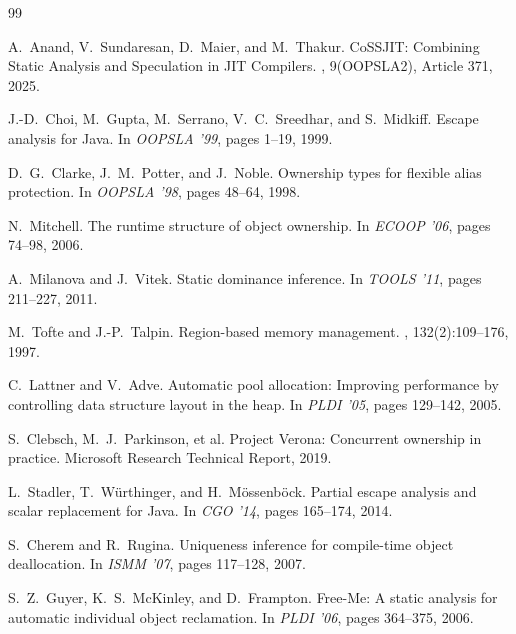 \documentclass[12pt,a4paper]{article}
\begin{document}

\begin{thebibliography}{99}

A.~Anand, V.~Sundaresan, D.~Maier, and M.~Thakur.
\newblock CoSSJIT: Combining Static Analysis and Speculation in JIT Compilers.
, 9(OOPSLA2), Article 371, 2025.

J.-D.~Choi, M.~Gupta, M.~Serrano, V.~C.~Sreedhar, and S.~Midkiff.
\newblock Escape analysis for {Java}.
\newblock In {\em OOPSLA '99}, pages 1--19, 1999.

D.~G.~Clarke, J.~M.~Potter, and J.~Noble.
\newblock Ownership types for flexible alias protection.
\newblock In {\em OOPSLA '98}, pages 48--64, 1998.

N.~Mitchell.
\newblock The runtime structure of object ownership.
\newblock In {\em ECOOP '06}, pages 74--98, 2006.

A.~Milanova and J.~Vitek.
\newblock Static dominance inference.
\newblock In {\em TOOLS '11}, pages 211--227, 2011.

M.~Tofte and J.-P.~Talpin.
\newblock Region-based memory management.
, 132(2):109--176, 1997.

C.~Lattner and V.~Adve.
\newblock Automatic pool allocation: Improving performance by controlling data structure layout in the heap.
\newblock In {\em PLDI '05}, pages 129--142, 2005.

S.~Clebsch, M.~J.~Parkinson, et al.
\newblock Project {Verona}: Concurrent ownership in practice.
\newblock Microsoft Research Technical Report, 2019.

L.~Stadler, T.~W\"urthinger, and H.~M\"ossenb\"ock.
\newblock Partial escape analysis and scalar replacement for {Java}.
\newblock In {\em CGO '14}, pages 165--174, 2014.

S.~Cherem and R.~Rugina.
\newblock Uniqueness inference for compile-time object deallocation.
\newblock In {\em ISMM '07}, pages 117--128, 2007.

S.~Z.~Guyer, K.~S.~McKinley, and D.~Frampton.
\newblock Free-Me: A static analysis for automatic individual object reclamation.
\newblock In {\em PLDI '06}, pages 364--375, 2006.


\end{thebibliography}
\end{document}
